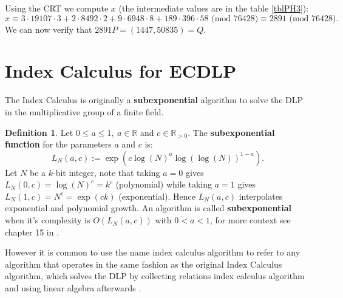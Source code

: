 \documentclass[thesis=M,english]{FITthesis}[2012/10/20]
\theoremstyle{remark}
\theoremstyle{definition}
\newtheorem{DF}{Definition}[section]
\begin{document}
\noindent Using the CRT we compute $x$ (the intermediate values are in the table \ref{tblPH3}):
$$
x \equiv 3\cdot 19107 \cdot 3 + 2\cdot 8492 \cdot 2 +  9\cdot 6948 \cdot 8 +  189\cdot 396 \cdot 58 \text{ (mod  76428)} \equiv 2891\text{ (mod  76428)}.
$$ We can now verify that $2891P = (1447, 50835) = Q.$
\section{Index Calculus for ECDLP}
The Index Calculus is originally a \textbf{subexponential} algorithm to solve the DLP in the multiplicative group of a finite field. 
\begin{DF}
Let $0\leq a \leq 1,\ a \in \mathbb{R}$ and $c \in \mathbb{R}_{>0}$. The \textbf{subexponential function} for the parameters $a$ and $c$ is:
$$
L_N(a,c) := \exp(c\log(N)^a \log(\log(N))^{1-a}).
$$
Let $N$ be a $k$-bit integer, note that taking $a=0$ gives $L_N(0,c) = \log(N)^c = k^c$ (polynomial) while taking $a=1$ gives $L_N(1,c) = N^c = \exp(ck)$ (exponential). Hence $L_N(a,c)$ interpolates exponential and polynomial growth. An algorithm is called \textbf{subexponential} when it's complexity is $O(L_N(a,c))$ with $0 < a < 1$, for more context see chapter 15 in \cite{subExp}.
\end{DF} 
\noindent However it is common to use the name index calculus algorithm to refer to any algorithm that operates in the same fashion as the original Index Calculus algorithm, which solves the DLP by collecting relations index calculus algorithm and using linear algebra afterwards \cite{amadori17}.
\end{document}
